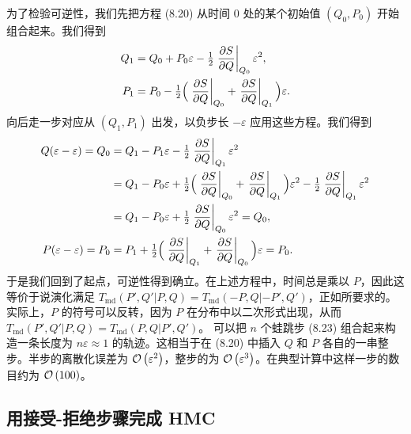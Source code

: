 为了检验可逆性，我们先把方程 (8.20) 从时间 0 处的某个初始值 $(Q_0,P_0)$ 开始组合起来。我们得到
\begin{equation}
\begin{split}
Q_1 &= Q_0 + P_0\varepsilon - \tfrac{1}{2}\left.\frac{\partial S}{\partial Q}\right|_{Q_0}\varepsilon^2, \\
P_1 &= P_0 - \tfrac{1}{2}\Big(\left.\frac{\partial S}{\partial Q}\right|_{Q_0}
  + \left.\frac{\partial S}{\partial Q}\right|_{Q_1}\Big)\varepsilon.
\end{split}
\end{equation}
向后走一步对应从 $(Q_1,P_1)$ 出发，以负步长 $-\varepsilon$ 应用这些方程。我们得到
\begin{equation}
\begin{split}
Q(\varepsilon - \varepsilon) = Q_0 &= Q_1 - P_1\varepsilon
  - \tfrac{1}{2}\left.\frac{\partial S}{\partial Q}\right|_{Q_1}\varepsilon^2 \\
&= Q_1 - P_0\varepsilon + \tfrac{1}{2}\Big(\left.\frac{\partial S}{\partial Q}\right|_{Q_0}
  + \left.\frac{\partial S}{\partial Q}\right|_{Q_1}\Big)\varepsilon^2
  - \tfrac{1}{2}\left.\frac{\partial S}{\partial Q}\right|_{Q_1}\varepsilon^2 \\
&= Q_1 - P_0\varepsilon + \tfrac{1}{2}\left.\frac{\partial S}{\partial Q}\right|_{Q_0}\varepsilon^2
  = Q_0, \\
P(\varepsilon - \varepsilon) = P_0 &= P_1 + \tfrac{1}{2}\Big(\left.\frac{\partial S}{\partial Q}\right|_{Q_1}
  + \left.\frac{\partial S}{\partial Q}\right|_{Q_0}\Big)\varepsilon = P_0.
\end{split}
\end{equation}
于是我们回到了起点，可逆性得到确立。在上述方程中，时间总是乘以 $P$，因此这等价于说演化满足 $T_{\mathrm{md}}(P',Q'|P,Q) = T_{\mathrm{md}}(-P,Q|-P',Q')$，正如所要求的。实际上，$P$ 的符号可以反转，因为 $P$ 在分布中以二次形式出现，从而
$T_{\mathrm{md}}(P',Q'|P,Q) = T_{\mathrm{md}}(P,Q|P',Q')$。
可以把 $n$ 个蛙跳步 (8.23) 组合起来构造一条长度为 $n\varepsilon \approx 1$ 的轨迹。这相当于在 (8.20) 中插入 $Q$ 和 $P$ 各自的一串整步。半步的离散化误差为 $\mathcal{O}\left(\varepsilon^2\right)$，整步的为 $\mathcal{O}\left(\varepsilon^3\right)$。在典型计算中这样一步的数目约为 $\mathcal{O}\left(100\right)$。

\subsection{用接受-拒绝步骤完成 HMC}

